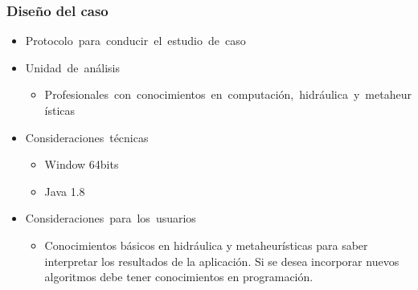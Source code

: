 \documentclass[9pt]{beamer}
\begin{document}
    \begin{frame}
        \frametitle{Diseño del caso}                       
        
        \begin{itemize}
            \item Protocolo para conducir el estudio de caso
            \item Unidad de análisis
            \begin{itemize}
                \item Profesionales con conocimientos en computación, hidráulica y metaheurísticas
            \end{itemize}

            \item Consideraciones técnicas	  
            \begin{itemize}
                \item Window 64bits
                \item Java 1.8
            \end{itemize}

            \item Consideraciones para los usuarios
            \begin{itemize}
                \item Conocimientos básicos en hidráulica y metaheurísticas para saber interpretar los resultados de la aplicación. Si se desea incorporar nuevos algoritmos debe tener conocimientos en programación.
        
            \end{itemize}
        \end{itemize}

    \end{frame}
\end{document}
